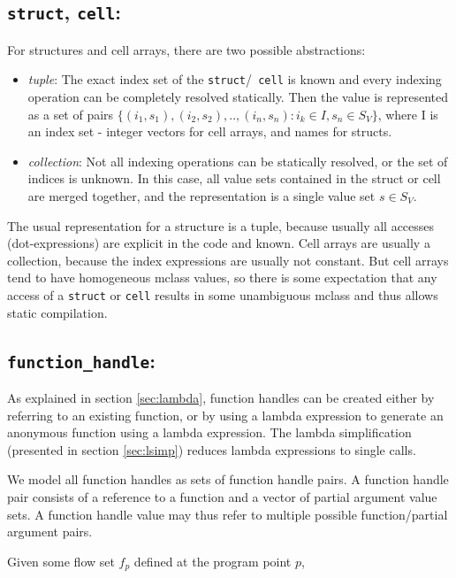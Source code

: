 \subsection{{\tt struct}, {\tt cell}:}
For structures and cell arrays, there are two possible abstractions:

\begin{itemize}
  \item \emph{tuple}: The exact index set of the {\tt struct}/{\tt
  cell} is known and every indexing operation can be completely
  resolved statically. Then the value is represented as a set of
  pairs $ \{(i_1, s_1), (i_2, s_2),..,(i_n, s_n) : i_k \in I, s_n \in
  S_V\} $, where I is an index set - integer vectors for cell
  arrays, and names for structs.

  \item \emph{collection}: Not all indexing operations can be
  statically resolved, or the set of indices is unknown. In this case,
  all value sets contained in the struct or cell are merged
  together, and the representation is a single value set $s \in S_V$.
\end{itemize}
The usual representation for a structure is a tuple, because
usually all accesses (dot-expressions) are explicit in the code and
known. Cell arrays are usually a collection, because the index
expressions are usually not constant. But cell arrays tend to have
homogeneous mclass values, so there is some expectation that any
access of a {\tt struct} or {\tt cell} results in some unambiguous
mclass and thus allows static compilation.

\subsection{{\tt function\_handle}:}
As explained in section \ref{sec:lambda}, function handles can be
created either by referring to an existing function, or by using a
lambda expression to generate an anonymous function using a lambda
expression. The lambda simplification (presented in
section \ref{sec:lsimp}) reduces lambda expressions to single calls.

We model all function handles as sets of function handle pairs. A
function handle pair consists of a reference to a function and a
vector of partial argument value sets. A function handle value may
thus refer to multiple possible function/partial argument pairs. 

Given some flow set $f_p$ defined at the program point $p$,

